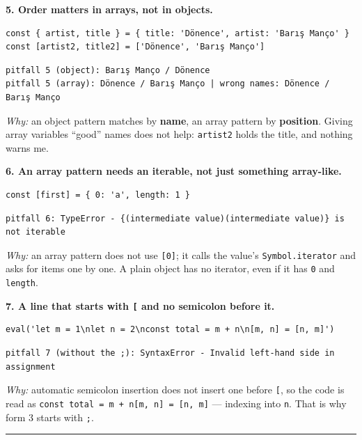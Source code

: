 \documentclass[
  10pt,
]{article}
\begin{document}
\textbf{5. Order matters in arrays, not in objects.}

\begin{verbatim}
const { artist, title } = { title: 'Dönence', artist: 'Barış Manço' }
const [artist2, title2] = ['Dönence', 'Barış Manço']
\end{verbatim}

\begin{verbatim}
pitfall 5 (object): Barış Manço / Dönence
pitfall 5 (array): Dönence / Barış Manço | wrong names: Dönence / Barış Manço
\end{verbatim}

\emph{Why:} an object pattern matches by \textbf{name}, an array pattern
by \textbf{position}. Giving array variables ``good'' names does not
help: \texttt{artist2} holds the title, and nothing warns me.

\textbf{6. An array pattern needs an iterable, not just something
array-like.}

\begin{verbatim}
const [first] = { 0: 'a', length: 1 }
\end{verbatim}

\begin{verbatim}
pitfall 6: TypeError - {(intermediate value)(intermediate value)} is not iterable
\end{verbatim}

\emph{Why:} an array pattern does not use \texttt{{[}0{]\allowbreak{}}};
it calls the value's \texttt{Symbol.\allowbreak{}iterator} and asks for
items one by one. A plain object has no iterator, even if it has
\texttt{0} and \texttt{length}.

\textbf{7. A line that starts with \texttt{{[}} and no semicolon before
it.}

\begin{verbatim}
eval('let m = 1\nlet n = 2\nconst total = m + n\n[m, n] = [n, m]')
\end{verbatim}

\begin{verbatim}
pitfall 7 (without the ;): SyntaxError - Invalid left-hand side in assignment
\end{verbatim}

\emph{Why:} automatic semicolon insertion does not insert one before
\texttt{{[}}, so the code is read as
\texttt{const\ total\ =\ m\ +\ n{[}m,\ n{]\allowbreak{}}\ =\ {[}n,\ m{]\allowbreak{}}}
--- indexing into \texttt{n}. That is why form 3 starts with \texttt{;}.

\begin{center}\rule{0.5\linewidth}{0.5pt}\end{center}
\end{document}
